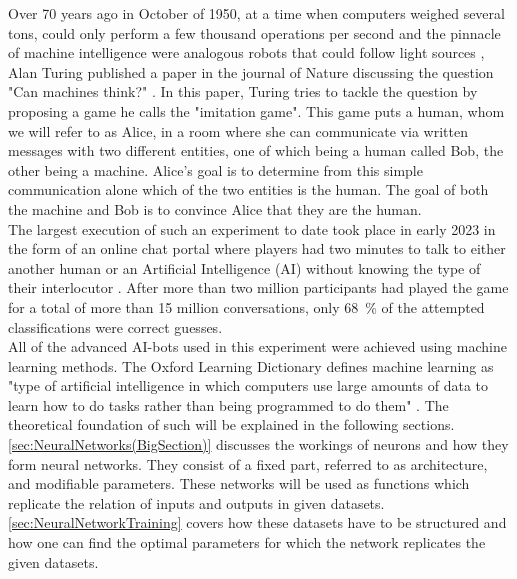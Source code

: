 Over 70 years ago in October of 1950, at a time when computers weighed several tons, could only perform a few thousand operations per second and the pinnacle of machine intelligence were analogous robots that could follow light sources \cite{FirstThinkingMachinesArticle}, Alan Turing published a paper in the journal of Nature discussing the question "Can machines think?" \cite{TuringThinkingPaper}. In this paper, Turing tries to tackle the question by proposing a game he calls the "imitation game". This game puts a human, whom we will refer to as Alice, in a room where she can communicate via written messages with two different entities, one of which being a human called Bob, the other being a machine. Alice's goal is to determine from this simple communication alone which of the two entities is the human. The goal of both the machine and Bob is to convince Alice that they are the human.\\
The largest execution of such an experiment to date took place in early 2023 in the form of an online chat portal where players had two minutes to talk to either another human or an Artificial Intelligence (AI) without knowing the type of their interlocutor \cite{TuringGamePaper}. After more than two million participants had played the game for a total of more than 15 million conversations, only \SI{68}{\percent} of the attempted classifications were correct guesses.\\
All of the advanced AI-bots used in this experiment were achieved using machine learning methods. The Oxford Learning Dictionary defines machine learning as "type of artificial intelligence in which computers use large amounts of data to learn how to do tasks rather than being programmed to do them" \cite{MLDefinition}. The theoretical foundation of such will be explained in the following sections.\\
\cref{sec:NeuralNetworks(BigSection)} discusses the workings of neurons and how they form neural networks. They consist of a fixed part, referred to as architecture, and modifiable parameters. These networks will be used as functions which replicate the relation of inputs and outputs in given datasets. \cref{sec:NeuralNetworkTraining} covers how these datasets have to be structured and how one can find the optimal parameters for which the network replicates the given datasets.
